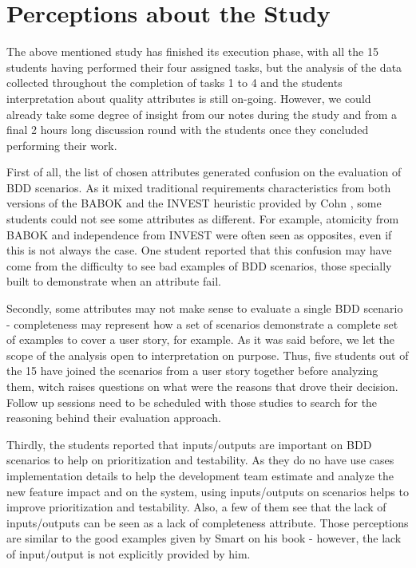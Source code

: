 \section{Perceptions about the Study}

The above mentioned study has finished its execution phase, with all the 15 students having performed their four assigned tasks, but the analysis of the data collected throughout the completion of tasks 1 to 4 and the students interpretation about quality attributes is still on-going. However, we could already take some degree of insight from our notes during the study and from a final 2 hours long discussion round with the students once they concluded performing their work.  

First of all, the list of chosen attributes generated confusion on the evaluation of BDD scenarios. As it mixed traditional requirements characteristics from both versions of the BABOK \cite{Babok_2009} \cite{Babok_2015} and the INVEST heuristic provided by Cohn \cite{Cohn_2004}, some students could not see some attributes as different. For example, atomicity from BABOK \cite{Babok_2015} and independence from INVEST \cite{Cohn_2004} were often seen as opposites, even if this is not always the case. One student reported that this confusion may have come from the difficulty to see bad examples of BDD scenarios, those specially built to demonstrate when an attribute fail.

Secondly, some attributes may not make sense to evaluate a single BDD scenario - completeness may represent how a set of scenarios demonstrate a complete set of examples to cover a user story, for example. As it was said before, we let the scope of the analysis open to interpretation on purpose. Thus, five students out of the 15 have joined the scenarios from a user story together before analyzing them, witch raises questions on what were the reasons that drove their decision. Follow up sessions need to be scheduled with those studies to search for the reasoning behind their evaluation approach. 

Thirdly, the students reported that inputs/outputs are important on BDD scenarios to help on prioritization and testability. As they do no have use cases implementation details to help the development team estimate and analyze the new feature impact and on the system, using inputs/outputs on scenarios helps to improve prioritization and testability. Also, a few of them see that the lack of inputs/outputs can be seen as a lack of completeness attribute. Those perceptions are similar to the good examples given by Smart \cite{Smart_2014} on his book - however, the lack of input/output is not explicitly provided by him.

